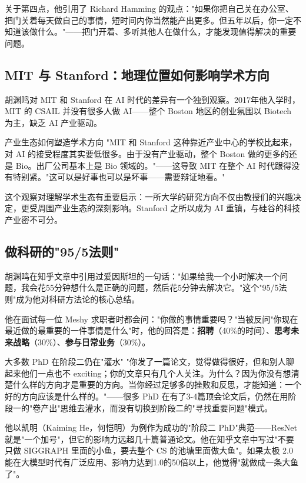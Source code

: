 关于第四点，他引用了 Richard Hamming 的观点："如果你把自己关在办公室、把门关着每天做自己的事情，短时间内你当然能产出更多。但五年以后，你一定不知道该做什么。"——把门开着、多听其他人在做什么，才能发现值得解决的重要问题。

\subsection{MIT 与 Stanford：地理位置如何影响学术方向}

胡渊鸣对 MIT 和 Stanford 在 AI 时代的差异有一个独到观察。2017年他入学时，MIT 的 CSAIL 并没有很多人做 AI——整个 Boston 地区的创业氛围以 Biotech 为主，缺乏 AI 产业驱动。

\begin{knowledgebox}{产业生态如何塑造学术方向}
"MIT 和 Stanford 这种靠近产业中心的学校比起来，对 AI 的接受程度其实要低很多。由于没有产业驱动，整个 Boston 做的更多的还是 Bio。出厂公司基本上是 Bio 领域的。"——这导致 MIT 在整个 AI 时代跟得没有特别紧。"这可以是好事也可以是坏事——需要辩证地看。"
\end{knowledgebox}

这个观察对理解学术生态有重要启示：一所大学的研究方向不仅由教授们的兴趣决定，更受周围产业生态的深刻影响。Stanford 之所以成为 AI 重镇，与硅谷的科技产业密不可分。

\subsection{做科研的"95/5法则"}

胡渊鸣在知乎文章中引用过爱因斯坦的一句话："如果给我一个小时解决一个问题，我会花55分钟想什么是正确的问题，然后花5分钟去解决它。"这个"95/5法则"成为他对科研方法论的核心总结。

他在面试每一位 Meshy 求职者时都会问："你做的事情重要吗？"当被反问"你现在最近做的最重要的一件事情是什么"时，他的回答是：\textbf{招聘}（40\%的时间）、\textbf{思考未来战略}（30\%）、\textbf{参与日常业务}（30\%）。

\begin{warningbox}{大多数 PhD 在阶段二仍在"灌水"}
"你发了一篇论文，觉得做得很好，但和别人聊起来他们一点也不 exciting；你的文章只有几个人关注。为什么？因为你没有想清楚什么样的方向才是重要的方向。当你经过足够多的挫败和反思，才能知道：一个好的方向应该是什么样的。"——很多 PhD 在有了3-4篇顶会论文后，仍然在用阶段一的"卷产出"思维去灌水，而没有切换到阶段二的"寻找重要问题"模式。
\end{warningbox}

他以凯明（Kaiming He，何恺明）为例作为成功的"阶段二 PhD"典范——ResNet 就是"一个加号"，但它的影响力远超几十篇普通论文。他在知乎文章中写过"不要只做 SIGGRAPH 里面的小鱼，要去整个 CS 的池塘里面做大鱼"。如果太极 2.0 能在大模型时代有广泛应用、影响力达到1.0的50倍以上，他觉得"就做成一条大鱼了"。

